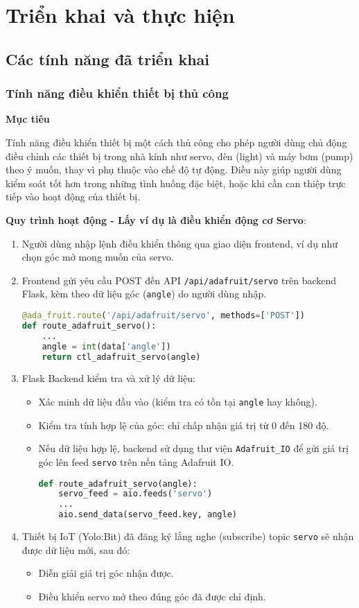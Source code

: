 \section{Triển khai và thực hiện}
\subsection{Các tính năng đã triển khai}
\subsubsection{Tính năng điều khiển thiết bị thủ công}

\textbf{Mục tiêu}

Tính năng điều khiển thiết bị một cách thủ công cho phép người dùng chủ động điều chỉnh các thiết bị trong nhà kính như servo, đèn (light) và máy bơm (pump) theo ý muốn, thay vì phụ thuộc vào chế độ tự động. Điều này giúp người dùng kiểm soát tốt hơn trong những tình huống đặc biệt, hoặc khi cần can thiệp trực tiếp vào hoạt động của thiết bị.

\textbf{Quy trình hoạt động - Lấy ví dụ là điều khiển động cơ Servo}:
\begin{enumerate}
    \item Người dùng nhập lệnh điều khiển thông qua giao diện frontend, ví dụ như chọn góc mở mong muốn của servo.
    \item Frontend gửi yêu cầu POST đến API \texttt{/api/adafruit/servo} trên backend Flask, kèm theo dữ liệu góc (\texttt{angle}) do người dùng nhập.
    \begin{lstlisting}[language=Python]
@ada_fruit.route('/api/adafruit/servo', methods=['POST'])
def route_adafruit_servo():
    ...
    angle = int(data['angle'])
    return ctl_adafruit_servo(angle)
    \end{lstlisting}
    \item Flask Backend kiểm tra và xử lý dữ liệu:
    \begin{itemize}
        \item Xác minh dữ liệu đầu vào (kiểm tra có tồn tại \texttt{angle} hay không).
        \item Kiểm tra tính hợp lệ của góc: chỉ chấp nhận giá trị từ 0 đến 180 độ.
        \item Nếu dữ liệu hợp lệ, backend sử dụng thư viện \texttt{Adafruit\_IO} để gửi giá trị góc lên feed \texttt{servo} trên nền tảng Adafruit IO.
        \begin{lstlisting}[language=Python]
def route_adafruit_servo(angle):
    servo_feed = aio.feeds('servo') 
    ...
    aio.send_data(servo_feed.key, angle) 
        \end{lstlisting}
    \end{itemize}
    \item Thiết bị IoT (Yolo:Bit) đã đăng ký lắng nghe (subscribe) topic \texttt{servo} sẽ nhận được dữ liệu mới, sau đó:
    \begin{itemize}
        \item Diễn giải giá trị góc nhận được.
        \item Điều khiển servo mở theo đúng góc đã được chỉ định.
    \end{itemize}
\end{enumerate}

